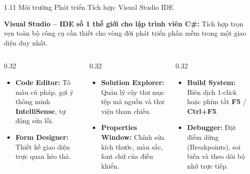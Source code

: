 \documentclass[aspectratio=169, 10pt]{beamer}
\begin{document}
\begin{frame}{1.11 Môi trường Phát triển Tích hợp: Visual Studio IDE}
  \begin{block}{\textbf{Visual Studio -- IDE số 1 thế giới cho lập trình viên C\#:}}
    Tích hợp trọn vẹn toàn bộ công cụ cần thiết cho vòng đời phát triển phần mềm trong một giao diện duy nhất.
  \end{block}
  \begin{columns}[T]
    \begin{column}{0.32\textwidth}
      \begin{tcolorbox}[colback=UniLightBlue,colframe=UniBlue,title=\textbf{Soạn thảo \& Thiết kế}]
        \begin{itemize}\scriptsize
          \item \textbf{Code Editor:} Tô màu cú pháp, gợi ý thông minh \textbf{IntelliSense}, tự động sửa lỗi.
          \item \textbf{Form Designer:} Thiết kế giao diện trực quan kéo thả.
        \end{itemize}
      \end{tcolorbox}
    \end{column}
    \begin{column}{0.32\textwidth}
      \begin{tcolorbox}[colback=CSharpPurple!10,colframe=CSharpPurple,title=\textbf{Quản lý \& Thuộc tính}]
        \begin{itemize}\scriptsize
          \item \textbf{Solution Explorer:} Quản lý cây thư mục tệp mã nguồn và thư viện tham chiếu.
          \item \textbf{Properties Window:} Chỉnh sửa kích thước, màu sắc, font chữ của điều khiển.
        \end{itemize}
      \end{tcolorbox}
    \end{column}
    \begin{column}{0.32\textwidth}
      \begin{tcolorbox}[colback=UniGreen!10,colframe=UniGreen,title=\textbf{Biên dịch \& Debug}]
        \begin{itemize}\scriptsize
          \item \textbf{Build System:} Biên dịch 1-click hoặc phím tắt \textbf{F5} / \textbf{Ctrl+F5}.
          \item \textbf{Debugger:} Đặt điểm dừng (Breakpoints), soi biến và theo dõi bộ nhớ trực tiếp.
        \end{itemize}
      \end{tcolorbox}
    \end{column}
  \end{columns}
\end{frame}
\end{document}
